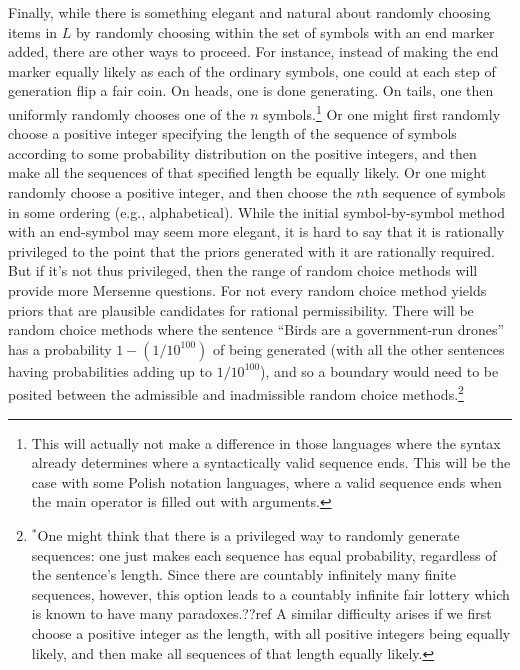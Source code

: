 Finally, while there is something elegant and natural about randomly choosing items in $L$ by randomly choosing within the
set of symbols with an end marker added, there are other ways to proceed. For instance, instead of making the end marker
equally likely as each of the ordinary symbols, one could at each step of generation flip a fair coin. On heads, one is done
generating. On tails, one then uniformly randomly chooses one of the $n$ symbols.\footnote{This will actually not make a 
difference in those languages where the syntax already determines where a syntactically valid sequence ends. This will be the
case with some Polish notation languages, where a valid sequence ends when the main operator is filled out with arguments.}
Or one might first randomly choose a positive integer specifying the length of the sequence of symbols according to some
probability distribution on the positive integers, and then make all the sequences of that specified length be equally likely. 
Or one might randomly choose a positive integer, and then choose the $n$th sequence of symbols in some ordering (e.g., alphabetical).
While the initial symbol-by-symbol method with an end-symbol may seem more elegant, it is hard to say that it is rationally
privileged to the point that the priors generated with it are rationally required. But if it's not thus privileged, then the
range of random choice methods will provide more Mersenne questions. For not every random choice method yields priors that
are plausible candidates for rational permissibility. There will be random choice methods where the sentence ``Birds are a government-run 
drones'' has a probability $1-(1/10^{100})$ of being generated (with all the other sentences having probabilities adding
up to $1/10^{100}$), and so a boundary would need to be
posited between the admissible and inadmissible random choice methods.\footnote{$^*$One might think that there is a 
privileged way to randomly generate sequences: one just makes each sequence has equal probability, regardless of the
sentence's length. Since there are countably infinitely many finite sequences, however, this option leads to a countably infinite fair
lottery which is known to have many paradoxes.??ref A similar difficulty arises if we first choose a positive integer
as the length, with all positive integers being equally likely, and then make all sequences of that length equally likely.}


